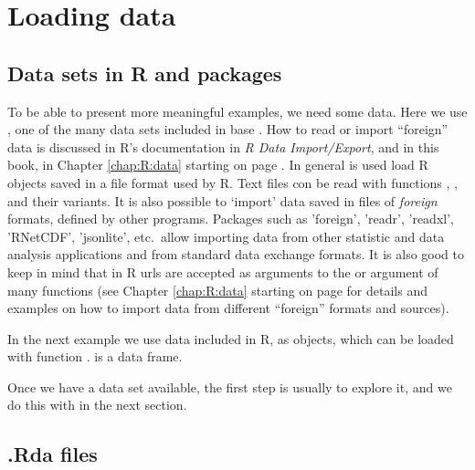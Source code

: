 \documentclass[krantz2]{krantz}\usepackage{knitr}%
\begin{document}

\section{Loading data}

\subsection{Data sets in R and packages}
To be able to present more meaningful examples, we need some data. Here we use , one of the many data sets included in base \Rpgrm. How to read or import ``foreign'' data is discussed in R's documentation in \emph{R Data Import/Export}, and in this book, in Chapter \ref{chap:R:data} starting on page \pageref{chap:R:data}. In general  is used load R objects saved in a file format used by R. Text files con be read with functions , ,  and their variants. It is also possible to `import' data saved in files of \textit{foreign} formats, defined by other programs. Packages such as 'foreign', 'readr', 'readxl', 'RNetCDF', 'jsonlite', etc.\ allow importing data from other statistic and data analysis applications and from standard data exchange formats. It is also good to keep in mind that in R urls are accepted as arguments to the  or  argument of many functions (see Chapter \ref{chap:R:data} starting on page \pageref{chap:R:data} for details and examples on how to import data from different ``foreign'' formats and sources).

In the next example we use data included in R, as \Rlang objects, which can be loaded with function .  is a data frame.

\begin{knitrout}\footnotesize
{}\color{fgcolor}\begin{kframe}
\begin{alltt}
\end{alltt}
\end{kframe}
\end{knitrout}

Once we have a data set available, the first step is usually to explore it, and we do this with  in the next section.

\subsection{.Rda files}\label{sec:data:rda}
\end{document}
